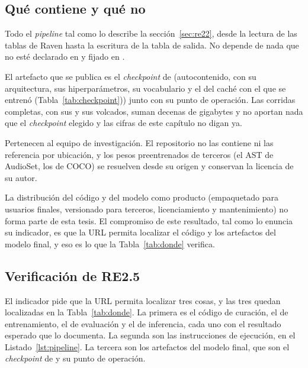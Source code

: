 \subsection{Qué contiene y qué no}

 Todo el \textit{pipeline} tal como lo describe la
sección~\ref{sec:re22}, desde la lectura de las tablas de Raven hasta la escritura
de la tabla de salida. No depende de nada que no esté declarado en
 y fijado en .

 El artefacto que se publica es el
\textit{checkpoint} de \rWinnerRun{} (autocontenido, con su arquitectura, sus
hiperparámetros, su vocabulario y el  del caché con el que se
entrenó (Tabla~\ref{tab:checkpoint})) junto con su punto de operación. Las
corridas completas, con sus  y sus volcados, suman decenas de
gigabytes y no aportan nada que el \textit{checkpoint} elegido y las cifras de
este capítulo no digan ya.

 Pertenecen al equipo de
investigación. El repositorio no las contiene ni las referencia por ubicación, y
los pesos preentrenados de terceros (el AST de AudioSet, los de COCO) se
resuelven desde su origen y conservan la licencia de su autor.

 La distribución del código y del modelo como producto
(empaquetado para usuarios finales, versionado para terceros, licenciamiento y
mantenimiento) no forma parte de esta tesis. El compromiso de este resultado,
tal como lo enuncia su indicador, es que la URL permita localizar el código y los
artefactos del modelo final, y eso es lo que la Tabla~\ref{tab:donde} verifica.

\subsection{Verificación de RE2.5}
\label{sec:verificacion-re25}

El indicador pide que la URL permita localizar tres cosas, y las tres quedan
localizadas en la Tabla~\ref{tab:donde}. La primera es el código de curación, el
de entrenamiento, el de evaluación y el de inferencia, cada uno con el resultado
esperado que lo documenta. La segunda son las instrucciones de ejecución, en el
Listado~\ref{lst:pipeline}. La tercera son los artefactos del modelo final, que
son el \textit{checkpoint} de \rWinnerRun{} y su punto de operación.

